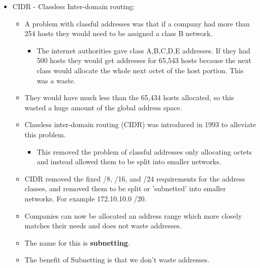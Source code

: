 \begin{itemize}
    \item CIDR - Classless Inter-domain routing:
        \begin{itemize}
            \item A problem with classful addresses was that if a company had more than 254 hosts they would need to be assigned a class B network.
                \begin{itemize}
                    \item The internet authorities gave class A,B,C,D,E addresses. If they had 500 hosts they would get addresses for 65,543 hosts because the next class would allocate the whole next octet of the host portion. This was a waste.
                \end{itemize}
            \item They would have much less than the 65,434 hosts allocated, so this wasted a huge amount of the global address space.
            \item Classless inter-domain routing (CIDR) was introduced in 1993 to alleviate this problem.
                \begin{itemize}
                    \item This removed the problem of classful addresses only allocating octets and instead allowed them to be split into smaller networks.
                \end{itemize}
            
            \item CIDR removed the fixed /8, /16, and /24 requirements for the address classes, and removed them to be split or 'subnetted' into smaller networks. For example 172.10.10.0 /20.
            \item Companies can now be allocated an address range which more closely matches their needs and does not waste addresses.
            \item The name for this is \textbf{subnetting}.
            \item The benefit of Subnetting is that we don't waste addresses.
        \end{itemize}
    

\end{itemize}

